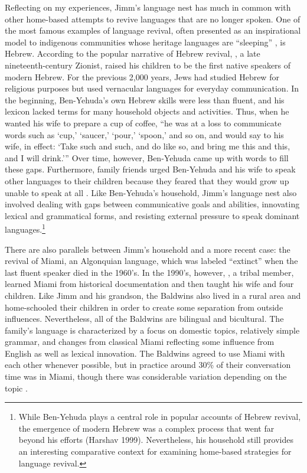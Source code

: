 \documentclass[output=paper]{LSP/langsci}
\begin{document}
Reflecting on my experiences, Jimm's language nest has much in common with other home-based attempts to revive languages that are no longer spoken. One of the most famous examples of language revival, often presented as an inspirational model to indigenous communities whose heritage languages are ``sleeping'' \citep[see][]{Hinton2008}, is Hebrew. According to the popular narrative of Hebrew revival, , a late nineteenth-century Zionist, raised his children to be the first native speakers of modern Hebrew. For the previous 2,000 years, Jews had studied Hebrew for religious purposes but used vernacular languages for everyday communication. In the beginning, Ben-Yehuda's own Hebrew skills were less than fluent, and his lexicon lacked terms for many household objects and activities. Thus, when he wanted his wife to prepare a cup of coffee, ``he was at a loss to communicate words such as `cup,' `saucer,' `pour,' `spoon,' and so on, and would say to his wife, in effect: `Take such and such, and do like so, and bring me this and this, and I will drink.'\thinspace'' \citep[37--38]{Fellman1973} Over time, however, Ben-Yehuda came up with words to fill these gaps. Furthermore, family friends urged Ben-Yehuda and his wife to speak other languages to their children because they feared that they would grow up unable to speak at all \citep[50--53]{BenAvi1984}. Like Ben-Yehuda's household, Jimm's language nest also involved dealing with gaps between communicative goals and abilities, innovating lexical and grammatical forms, and resisting external pressure to speak dominant languages.\footnote{While Ben-Yehuda plays a central role in popular accounts of Hebrew revival, the emergence of modern Hebrew was a complex process that went far beyond his efforts (Harshav 1999). Nevertheless, his household still provides an interesting comparative context for examining home-based strategies for language revival.}

There are also parallels between Jimm's household and a more recent case: the revival of Miami, an Algonquian language, which was labeled ``extinct'' when the last fluent speaker died in the 1960's. In the 1990's, however, , a tribal member, learned Miami from historical documentation and then taught his wife and four children. Like Jimm and his grandson, the Baldwins also lived in a rural area and home-schooled their children in order to create some separation from outside influences. Nevertheless, all of the Baldwins are bilingual and bicultural. The family's language is characterized by a focus on domestic topics, relatively simple grammar, and changes from classical Miami reflecting some influence from English as well as lexical innovation. The Baldwins agreed to use Miami with each other whenever possible, but in practice around 30\% of their conversation time was in Miami, though there was considerable variation depending on the topic \citep[14]{Leonard2007}.
\end{document}
